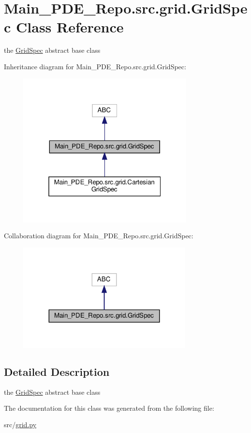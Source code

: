\hypertarget{classMain__PDE__Repo_1_1src_1_1grid_1_1GridSpec}{}\section{Main\+\_\+\+P\+D\+E\+\_\+\+Repo.\+src.\+grid.\+Grid\+Spec Class Reference}
\label{classMain__PDE__Repo_1_1src_1_1grid_1_1GridSpec}


the \hyperlink{classMain__PDE__Repo_1_1src_1_1grid_1_1GridSpec}{Grid\+Spec} abstract base class  




Inheritance diagram for Main\+\_\+\+P\+D\+E\+\_\+\+Repo.\+src.\+grid.\+Grid\+Spec\+:
\nopagebreak
\begin{figure}[H]
\begin{center}
\leavevmode
\includegraphics[width=253pt]{classMain__PDE__Repo_1_1src_1_1grid_1_1GridSpec__inherit__graph}
\end{center}
\end{figure}


Collaboration diagram for Main\+\_\+\+P\+D\+E\+\_\+\+Repo.\+src.\+grid.\+Grid\+Spec\+:
\nopagebreak
\begin{figure}[H]
\begin{center}
\leavevmode
\includegraphics[width=251pt]{classMain__PDE__Repo_1_1src_1_1grid_1_1GridSpec__coll__graph}
\end{center}
\end{figure}


\subsection{Detailed Description}
the \hyperlink{classMain__PDE__Repo_1_1src_1_1grid_1_1GridSpec}{Grid\+Spec} abstract base class 

The documentation for this class was generated from the following file\+:\begin{DoxyCompactItemize}
\item 
src/\hyperlink{grid_8py}{grid.\+py}\end{DoxyCompactItemize}
